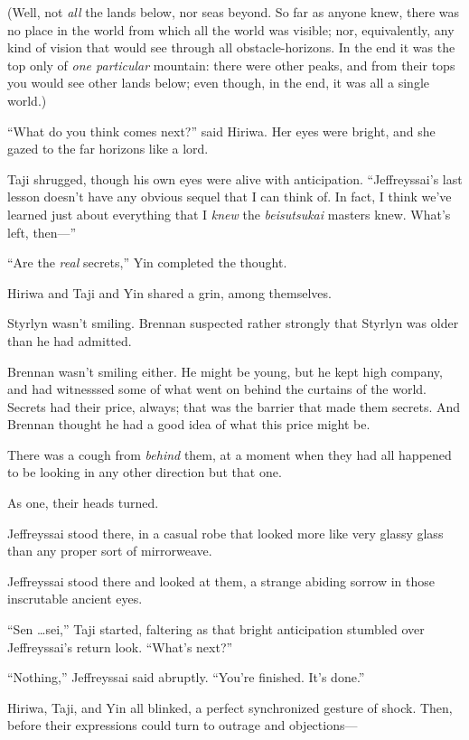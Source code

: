 {
 (Well, not \textit{all} the lands below, nor seas beyond. So far
as anyone knew, there was no place in the world from which all the
world was visible; nor, equivalently, any kind of vision that would see
through all obstacle-horizons. In the end it was the top only of
\textit{one particular} mountain: there were other peaks, and from
their tops you would see other lands below; even though, in the end, it
was all a single world.)}

{
 ``What do you think comes
next?'' said Hiriwa. Her eyes were bright, and she
gazed to the far horizons like a lord.}

{
 Taji shrugged, though his own eyes were alive with anticipation.
``Jeffreyssai's last lesson
doesn't have any obvious sequel that I can think of. In
fact, I think we've learned just about everything that
I \textit{knew} the \textit{beisutsukai} masters knew.
What's left, then---''}

{
 ``Are the \textit{real}
secrets,'' Yin completed the thought.}

{
 Hiriwa and Taji and Yin shared a grin, among themselves.}

{
 Styrlyn wasn't smiling. Brennan suspected rather
strongly that Styrlyn was older than he had admitted.}

{
 Brennan wasn't smiling either. He might be young,
but he kept high company, and had witnesssed some of what went on
behind the curtains of the world. Secrets had their price, always; that
was the barrier that made them secrets. And Brennan thought he had a
good idea of what this price might be.}

{
 There was a cough from \textit{behind} them, at a moment when they
had all happened to be looking in any other direction but that one.}

{
 As one, their heads turned.}

{
 Jeffreyssai stood there, in a casual robe that looked more like
very glassy glass than any proper sort of mirrorweave.}

{
 Jeffreyssai stood there and looked at them, a strange abiding
sorrow in those inscrutable ancient eyes.}

{
 ``Sen \ldots sei,'' Taji
started, faltering as that bright anticipation stumbled over
Jeffreyssai's return look.
``What's next?''}

{
 ``Nothing,'' Jeffreyssai said
abruptly. ``You're finished.
It's done.''}

{
 Hiriwa, Taji, and Yin all blinked, a perfect synchronized gesture
of shock. Then, before their expressions could turn to outrage and
objections---}

